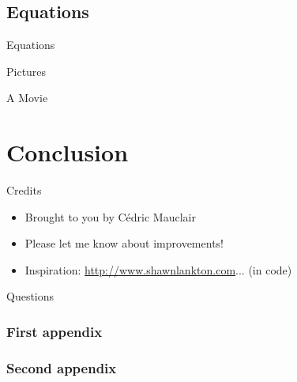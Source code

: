 \subsection{Equations}


\begin{frame}
  {Equations}

  \begin{itemize}

  \end{itemize}
\end{frame}


\begin{frame}
  {Pictures}

\end{frame}


\begin{frame}
  {A Movie}


\end{frame}


\section
  {Conclusion}

\begin{bibunit}[plain]
\begin{frame}
  {Credits}

  \begin{itemize}
  \item Brought to you by Cédric Mauclair
  \item Please let me know about improvements!
  \item Inspiration: \url{http://www.shawnlankton.com}... (in code)
  \end{itemize}

  \nocite{ipsum}
  

\end{frame}
\end{bibunit}

\begin{bibunit}[plain]
\begin{frame}
  {Questions}

  \nocite{lorem}
  

\end{frame}
\end{bibunit}


\appendix[Appendices]

\begin{frame}
  \frametitle{First appendix}
\end{frame}

\begin{frame}
  \frametitle{Second appendix}
\end{frame}




